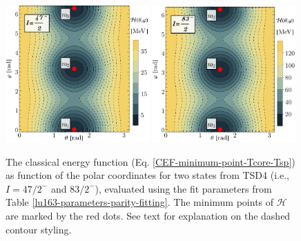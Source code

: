 \begin{figure}
    \centering
    \includegraphics[width=0.49\textwidth]{Chapters/Figures/parity-partners-plots/contour-tsd4-1.pdf}
    \includegraphics[width=0.49\textwidth]{Chapters/Figures/parity-partners-plots/contour-tsd4-2.pdf}
    \caption{The classical energy function (Eq. \ref{CEF-minimum-point-Tcore-Tsp}) as function of the polar coordinates for two states from TSD4 (i.e., $I=47/2^-$ and $83/2^-$), evaluated using the fit parameters from Table \ref{lu163-parameters-parity-fitting}. The minimum points of $\mathcal{H}$ are marked by the red dots. See text for explanation on the dashed contour styling.}
    \label{contour-cef-polar-tsd4}
\end{figure}


